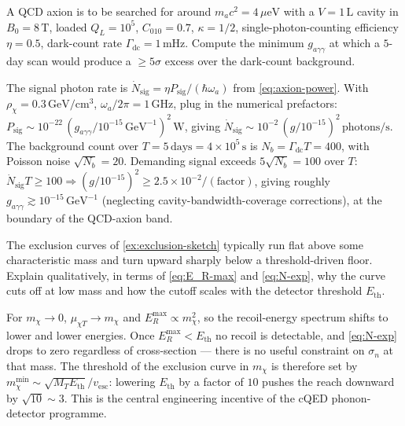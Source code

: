 \begin{exercise}
A QCD axion is to be searched for around $m_a c^2=4\,\mu\text{eV}$
with a $V=1\,\text{L}$ cavity in $B_0=8\,\text{T}$, loaded
$Q_L=10^5$, $C_{010}=0.7$, $\kappa=1/2$, single-photon-counting
efficiency $\eta=0.5$, dark-count rate
$\Gamma_\text{dc}=1\,\text{mHz}$. Compute the minimum
$g_{a\gamma\gamma}$ at which a $5$-day scan would produce
a $\geq 5\sigma$ excess over the dark-count background.
\begin{solution}
The signal photon rate is
$\dot N_\text{sig}=\eta P_\text{sig}/(\hbar\omega_a)$ from
\cref{eq:axion-power}. With $\rho_\chi=0.3\,\text{GeV}/\text{cm}^3$,
$\omega_a/2\pi=1\,\text{GHz}$, plug in the numerical prefactors:
$P_\text{sig}\sim 10^{-22}\,(g_{a\gamma\gamma}/10^{-15}\,\text{GeV}^{-1})^2\,\text{W}$,
giving $\dot N_\text{sig}\sim 10^{-2}\,(g/10^{-15})^2\,\text{photons/s}$.
The background count over $T=5\,\text{days}=4\times 10^5\,\text{s}$
is $N_b=\Gamma_\text{dc}T=400$, with Poisson noise
$\sqrt{N_b}=20$. Demanding signal exceeds $5\sqrt{N_b}=100$ over
$T$:
$\dot N_\text{sig} T\geq 100\Rightarrow (g/10^{-15})^2\geq
2.5\times 10^{-2}/(\text{factor})$, giving roughly
$g_{a\gamma\gamma}\gtrsim 10^{-15}\,\text{GeV}^{-1}$
(neglecting cavity-bandwidth-coverage corrections), at the boundary of the QCD-axion band.
\end{solution}
\end{exercise}

\begin{exercise}
The exclusion curves of \cref{ex:exclusion-sketch} typically run
flat above some characteristic mass and turn upward sharply below
a threshold-driven floor. Explain qualitatively, in terms of
\cref{eq:E_R-max} and \cref{eq:N-exp}, why the curve cuts off at
low mass and how the cutoff scales with the detector threshold
$E_\text{th}$.
\begin{solution}
For $m_\chi\to 0$, $\mu_{\chi T}\to m_\chi$ and
$E_R^\text{max}\propto m_\chi^2$, so the recoil-energy spectrum
shifts to lower and lower energies. Once $E_R^\text{max}<E_\text{th}$
no recoil is detectable, and \cref{eq:N-exp} drops to zero
regardless of cross-section --- there is no useful constraint
on $\sigma_n$ at that mass. The threshold of the exclusion curve
in $m_\chi$ is therefore set by
$m_\chi^\text{min}\sim\sqrt{M_T E_\text{th}}/v_\text{esc}$:
lowering $E_\text{th}$ by a factor of $10$ pushes the reach
downward by $\sqrt{10}\sim 3$. This is the central engineering
incentive of the cQED phonon-detector programme.
\end{solution}
\end{exercise}
